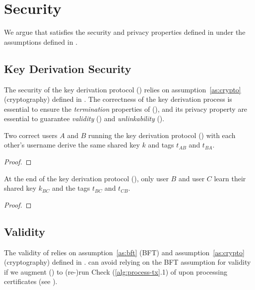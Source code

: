 \section{Security} \label{sec:security}
We argue that \sysname satisfies the security and privacy properties defined in  under the assumptions defined in .

\subsection{Key Derivation Security} \label{sec:key-derivation-security}
The security of the \sysname key derivation protocol () relies on assumption~\ref{as:crypto} (cryptography) defined in .
%
The correctness of the key derivation process is essential to ensure the \emph{termination} properties of \sysname (), and its privacy property are essential to guarantee \emph{validity} () and \emph{unlinkability} ().

\begin{theorem} \label{th:key-derivation-correctness}
    Two correct users $A$ and $B$ running the \sysname key derivation protocol () with each other's username derive the same shared key $k$ and tags $t_{AB}$ and $t_{BA}$.
\end{theorem}
\begin{proof}
\end{proof}

\begin{theorem} \label{th:key-derivation-privacy}
    At the end of the \sysname key derivation protocol (), only user $B$ and user $C$ learn their shared key $k_{BC}$ and the tags $t_{BC}$ and $t_{CB}$.
\end{theorem}
\begin{proof}
\end{proof}


\subsection{Validity} \label{sec:validity}
The validity of \sysname relies on assumption~\ref{as:bft} (BFT) and assumption~\ref{as:crypto} (cryptography)  defined in . \sysname can avoid relying on the BFT assumption for validity if we augment  () to (re-)run Check (\ref{alg:process-tx}.1) of  upon processing certificates (see ).


